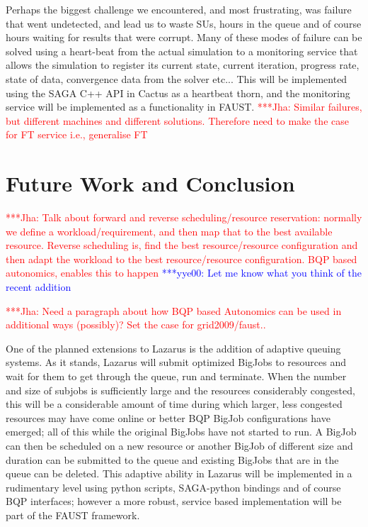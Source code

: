 \documentclass[conference,final]{IEEEtran}
\newcommand{\jhanote}[1]{ {\textcolor{red} { ***Jha: #1 }}}
\newcommand{\yyenote}[1]{ {\textcolor{blue} { ***yye00: #1 }}}
\newcommand{\jhanote}[1]{}
\newcommand{\yyenote}[1]{}
\begin{document}
Perhaps the biggest challenge we encountered, and most frustrating,
was failure that went undetected, and lead us to waste SUs, hours in
the queue and of course hours waiting for results that were
corrupt. Many of these modes of failure can be solved using a
heart-beat from the actual simulation to a monitoring service that
allows the simulation to register its current state, current
iteration, progress rate, state of data, convergence data from the
solver etc... This will be implemented using the SAGA C++ API in
Cactus as a heartbeat thorn, and the monitoring service will be
implemented as a functionality in FAUST.  \jhanote{Similar failures,
  but different machines and different solutions. Therefore need to
  make the case for FT service i.e., generalise FT}


\section{Future Work and Conclusion}

\jhanote{Talk about forward and reverse scheduling/resource
  reservation: normally we define a workload/requirement, and then map
  that to the best available resource. Reverse scheduling is, find the
  best resource/resource configuration and then adapt the workload to
  the best resource/resource configuration. BQP based autonomics,
  enables this to happen}
\yyenote{Let me know what you think of the recent addition}

\jhanote{Need a paragraph about how BQP based Autonomics can be used
  in additional ways (possibly)? Set the case for grid2009/faust..}

One of the planned extensions to Lazarus is the addition of adaptive
queuing systems. As it stands, Lazarus will submit optimized BigJobs to
resources and wait for them to get through the queue, run and terminate.
 When the number and size of subjobs is
sufficiently large and the resources considerably congested,
this will be a considerable amount of time
during which larger, less congested resources may have come online or better BQP
BigJob configurations have emerged; all of this
while the original BigJobs have not started to run. A BigJob can then be scheduled
on a new resource or another BigJob of different size and duration
can be submitted to the queue and existing BigJobs that are in the queue
can be deleted. This adaptive ability in Lazarus will be implemented
in a rudimentary level using python scripts, SAGA-python bindings and of
course BQP interfaces; however a more robust, service based implementation
will be part of the FAUST framework.
\end{document}
